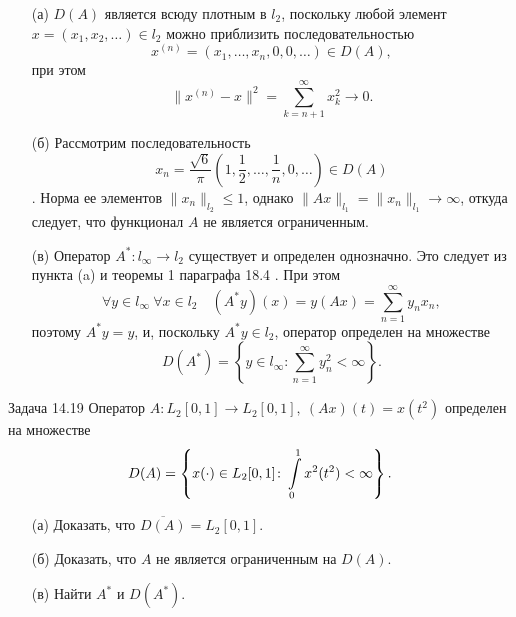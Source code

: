 \documentclass[16pt]{article}
\newenvironment{Sol}{\par\noindent{\it Решение:}}
\newcommand\A{(\cdot)}
\newcommand\Int[2]{\int\limits_{#1}^{#2}}
\begin{document}
\begin{Sol}
\begin{itemize}
\item[(а)] $D(A)$ является всюду плотным в $l_2$, поскольку любой элемент $x = (x_1, x_2, \ldots)
 \in l_2$ можно приблизить последовательностью
$$x^{\left(n\right)} = (x_1, \ldots, x_n, 0, 0, \dots) \in D(A),$$ при этом\\
$$\|x^{\left(n\right)} - x\|^2 = 
\sum\limits_{k = n+1}^\infty x_k^2 \to 0.$$
\item[(б)] Рассмотрим последовательность $$x_n = \frac{\sqrt{6}}{\pi}\left(1, \frac{1}{2}, \ldots, \frac{1}{n}, 0, \ldots\right) \in D(A)$$.
Норма ее элементов $\|x_n\|_{l_2} \leqslant 1$, однако $\|Ax\|_{l_1} = \|x_n\|_{l_1} \to \infty$, откуда следует,
 что функционал $A$ не является ограниченным.
\item[(в)] Оператор $A^* \colon l_\infty \to l_2$ существует и определен однозначно. Это следует из пункта (a) и теоремы 1 параграфа 18.4 \cite{tren}. При этом $$\forall y \in l_\infty \ \forall x \in l_2 \quad
(A^*y)(x) = y(Ax) = \sum_{n=1}^\infty y_n x_n,$$ поэтому $A^*y =y$, и, поскольку $A^*y \in l_2$, оператор определен
на множестве $$D(A^*) = \left\{y \in l_\infty \colon \sum_{n=1}^\infty y_n^2 < \infty \right\}.$$
\end{itemize}
\end{Sol}

\paragraph{Задача 14.19} Оператор $A\colon L_2[0, 1] \to L_2[0, 1], \ (Ax)(t) = x(t^2)$ определен на множестве \\
$$D(A) = \left\{x\A \in L_2[0,1] \colon \Int{0}{1}x^2(t^2) < \infty\right\}.$$
\begin{itemize}
\item[(а)] Доказать, что $\overline{D(A)} = L_2[0,1]$.
\item[(б)] Доказать, что $A$ не является ограниченным на $D(A)$.
\item[(в)] Найти $A^*$ и $D(A^*)$.
\end{itemize}
\end{document}
